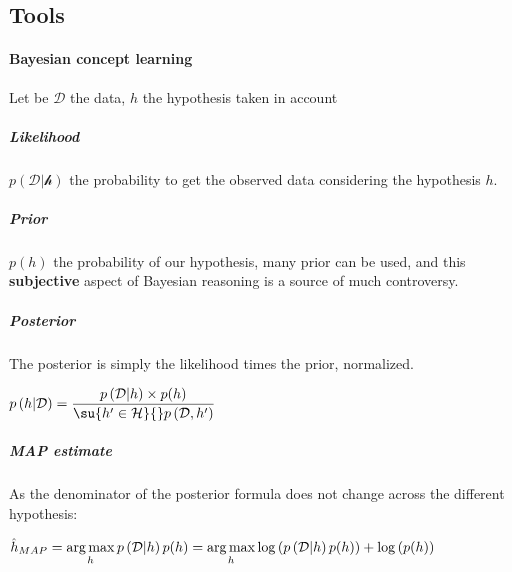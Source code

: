 \subsection{Tools}

\paragraph{Bayesian concept learning}
Let be $\mathcal{D}$ the data, $h$ the hypothesis taken in account
\subparagraph{Likelihood}
$p\left(\mathcal{D|h}\right)$ the probability to get the observed data considering the 
hypothesis $h$.
\subparagraph{Prior}
$p(h)$ the probability of our hypothesis, many prior can be used, and this 
\textbf{subjective} aspect of Bayesian reasoning is a source of much controversy.

\subparagraph{Posterior}
The posterior is simply the likelihood times the prior, normalized.
\begin{center}
$p\left(h|\mathcal{D}\right) = \dfrac{p\left(\mathcal{D}|h\right)\times p(h)}{
    \su{h'\in\mathcal{H}}{}p\left(\mathcal{D}, h'\right)
}$
\end{center}
\subparagraph{MAP estimate}
As the denominator of the posterior formula does not change across the different 
hypothesis:
\begin{center}
    $\hat{h}_{MAP} = \displaystyle\operatorname*{arg\,max}_{h} p\left(\mathcal{D}|h\right)p(h) = 
    \displaystyle\operatorname*{arg\,max}_{h} \log\left(p\left(\mathcal{D}|h\right)p(h)\right) + \log\left(
       p(h)\right)
    $
\end{center}



